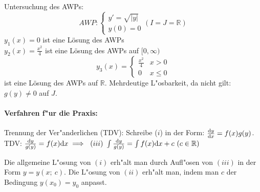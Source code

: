 \documentclass{article}
\begin{document}
\begin{beispiel}
Untersuchung des AWPs:
$$ AWP: \begin{cases}
y' = \sqrt{|y|} \\
y(0) = 0
\end{cases} (I = J = \mathbb{R})$$
$y_1(x) = 0$ ist eine Lösung des AWPs \\
$y_2(x) = \frac{x^2}{4}$ ist eine Lösung des AWPs auf $[0, \infty)$
$$ y_3(x) = 
\left\{ \begin{array}{ll}
\frac{x^2}{4} & x > 0 \\
0 & x \le 0
\end{array} \right. $$
ist eine Lösung des AWPs auf $\mathbb{R}$. Mehrdeutige L"osbarkeit, da nicht gilt: $g(y)\ne 0$ auf $J$.
\end{beispiel}

\paragraph{Verfahren f"ur die Praxis:} Trennung der Ver"anderlichen (TDV):
Schreibe ($i$) in der Form: $\frac{\mathrm{d} y}{\mathrm{d} x}=f(x)g(y)$. TDV:
$\frac{\mathrm{d} y}{g(y)}=f(x)\mathrm{d} x\implies \ (iii)\ \int\frac{\mathrm{d} y}{g(y)}=\int f(x)\mathrm{d} x + c\ (c\in\mathbb{R})$

Die allgemeine L"osung von $(i)$ erh"alt man durch Aufl"osen von $(iii)$ in der Form $y=y(x;\ c)$. Die L"osung
von $(ii)$ erh"alt man, indem man $c$ der Bedingung $y(x_0)=y_0$ anpasst.
\end{document}
